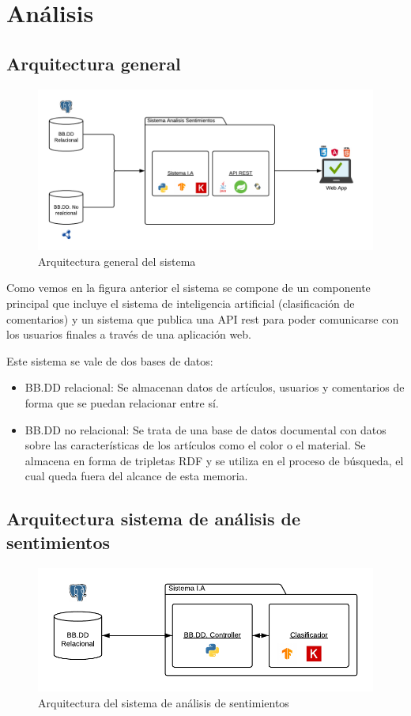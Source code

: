\chapter{Análisis}
\section{Arquitectura general}


\begin{figure}[!ht]
	\centering
	\includegraphics[width=1\textwidth]{imaxes/arqGeneral.png}
	\caption{Arquitectura general del sistema}
	\label{arqGen}
\end{figure}

Como vemos en la figura anterior el sistema se compone de un componente principal que incluye el sistema de inteligencia artificial (clasificación de comentarios) y un sistema que publica una API rest para poder comunicarse con los usuarios finales a través de una aplicación web.

Este sistema se vale de dos bases de datos:
\begin{itemize}
 \item BB.DD relacional: Se almacenan datos de artículos, usuarios y comentarios de forma que se puedan relacionar entre sí.
 \item BB.DD no relacional: Se trata de una base de datos documental con datos sobre las características de los artículos como el color o el material. Se almacena en forma de tripletas RDF y se utiliza en el proceso de búsqueda, el cual queda fuera del alcance de esta memoria.
\end{itemize}

\section{Arquitectura sistema de análisis de sentimientos}

\begin{figure}[H]
	\centering
	\includegraphics[width=1\textwidth]{imaxes/arqAI.png}
	\caption{Arquitectura del sistema de análisis de sentimientos}
	\label{arqAI}
\end{figure}

